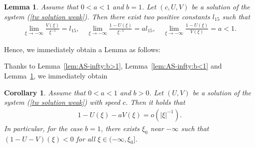 \documentclass[11pt,a4paper]{article}
\newtheorem{lemma}[theorem]{\textbf{Lemma}}
\newtheorem{corollary}[theorem]{\textbf{Corollary}}
\numberwithin{equation}{section}
\numberwithin{figure}{section}
\newcommand\bea{\begin{eqnarray}}
\newcommand\eea{\end{eqnarray}}
\newcommand\beaa{\begin{eqnarray*}}
\newcommand\eeaa{\end{eqnarray*}}
\begin{document}
\begin{lemma}\label{lem:AS-infty:b=1}
Assume that $0<a<1$ and $b=1$.
Let $(c,U,V)$ be a solution of the system (\ref{tw solution weak}).
Then there exist two positive constants $l_{15}$ such that
\beaa
\lim_{\xi\to-\infty}\frac{V(\xi)}{\xi^{-1}}=l_{15},\quad \lim_{\xi\to-\infty}\frac{1-U(\xi)}{\xi^{-1}}=a l_{15}, \quad \lim_{\xi\to-\infty}\frac{1-U(\xi)}{V(\xi)}=a<1.
\eeaa
\end{lemma}


Hence, we immediately obtain a Lemma as follows:

Thanks to Lemma~\ref{lem:AS-infty:b>1}, Lemma~\ref{lem:AS-infty:b<1} and Lemma~\ref{lem:AS-infty:b=1}, we immediately obtain

\begin{corollary}\label{lm: behavior around - infty b=1}
Assume that $0<a<1$ and $b>0$.
Let $(U,V)$ be a solution of the system (\ref{tw solution weak}) with speed $c$. Then it holds that
\beaa
1-U(\xi)-aV(\xi)=o(|\xi|^{-1}).
\eeaa
In particular, for the case $b=1$,
there exists $\xi_0$ near $-\infty$ such that $(1-U-V)(\xi)< 0$ for all $\xi\in(-\infty,\xi_0]$.
\end{corollary}

\end{document}
